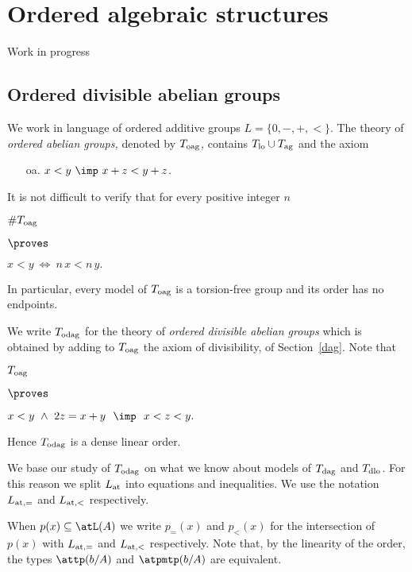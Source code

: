 \chapter{Ordered algebraic structures}
\label{oalgebraic}


Work in progress

\section{Ordered divisible abelian groups}

\def\medrel#1{\parbox{5ex}{\hfil$\displaystyle #1$}}
\def\ceq#1#2#3{\parbox{20ex}{$\displaystyle #1$}\medrel{#2}$\displaystyle  #3$}

We work in language of ordered additive groups $L=\{0,-,+, <\}$.
%
The theory of \emph{ordered abelian groups,} denoted by \emph{$T_{\rm oag}$,} contains $T_{\rm lo}\cup T_{\rm ag}$ and the axiom

\begin{itemize}
  \item[oa.] $x<y\ \imp\ x+z<y+z$.
\end{itemize}

It is not difficult to verify that for every positive integer $n$

\ceq{\#\hfill T_{\rm oag}}{\proves}{x < y \ \iff\ n\,x<n\,y.}

In particular, every model of $T_{\rm oag}$ is a torsion-free group and its order has no endpoints.

We write \emph{$T_{\rm odag}$\/} for the theory of \emph{ordered divisible abelian groups\/} which is obtained by adding to $T_{\rm oag}$ the axiom of divisibility,  of Section~\ref{dag}.
%
Note that

\ceq{\hfill T_{\rm oag}}{\proves}{x < y\ \wedge\ 2z=x+y\ \ \imp\ \ x<z<y.}

Hence $T_{\rm odag}$ is a dense linear order.


We base our study of $T_{\rm odag}$ on what we know about models of $T_{\rm dag}$ and $T_{\rm dlo}$.
%
For this reason we split $L_{\rm at}$ into equations and inequalities.
%
We use the notation \emph{$L_{\rm at,=}$\/} and \emph{$L_{\rm at,<}$\/} respectively.

When $p(x)\subseteq\atL(A)$ we write $p_{=}(x)$ and $p_{<}(x)$ for the intersection of $p(x)$ with $L_{\rm at,=}$ and $L_{\rm at,<}$ respectively.
Note that, by the linearity of the order, the types $\attp(b/A)$ and $\atpmtp(b/A)$ are equivalent.

